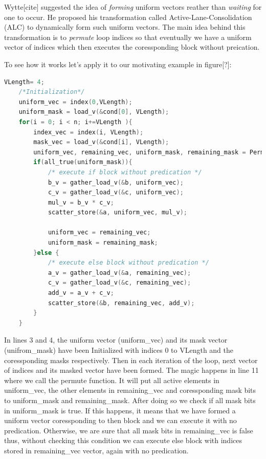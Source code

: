 \documentclass[\main/thesis.tex]{subfiles}
\begin{document}

Wytte[cite] suggested the idea of \emph{forming} uniform vectors reather than \emph{waiting} for one to occur. He proposed his transformation called Active-Lane-Consolidation (ALC) to dynamically form such uniform vectors. The main idea behind this transformation is to \emph{permute} loop indices
so that eventually we have a uniform vector of indices which then executes the coressponding block without preication. 

To see how it works let's apply it to our motivating example in figure[?]:
\begin{lstlisting}[language=C]
    VLength= 4;
    /*Initialization*/
    uniform_vec = index(0,VLength);
    uniform_mask = load_v(&cond[0], VLength);
    for(i = 0; i < n; i+=VLength ){
        index_vec = index(i, VLength);
        mask_vec = load_v(&cond[i], VLength);
        uniform_vec, remaining_vec, uniform_mask, remaining_mask = Permute(uniform_vec, index_vec, uniform_mask, mask_vec);        
        if(all_true(uniform_mask)){
            /* execute if block without predication */
            b_v = gather_load_v(&b, uniform_vec);
            c_v = gather_load_v(&c, uniform_vec);
            mul_v = b_v * c_v;
            scatter_store(&a, uniform_vec, mul_v);

            uniform_vec = remaining_vec;
            uniform_mask = remaining_mask;
        }else {     
            /* execute else block without predication */
            a_v = gather_load_v(&a, remaining_vec);
            c_v = gather_load_v(&c, remaining_vec);
            add_v = a_v + c_v;
            scatter_store(&b, remaining_vec, add_v);
        } 
    }
\end{lstlisting}

In lines 3 and 4, the uniform vector (uniform\_vec) and its mask vector (unifrom\_mask) have been Initialized with indices 0 to VLength and the coressponding masks respectively.
Then in each iteration of the loop, next vector of indices and its masked vector have been formed. The magic happens in line 11 where we call the permute function. It will put all active elements in uniform\_vec, the other elements in remaining\_vec and coressponding mask bits to uniform\_mask and remaining\_mask.
After doing so we check if all mask bits in uniform\_mask is true. If this happens, it means that we have formed a uniform vector coressponding to then block and we can execute it with no predication. Otherwise, we are sure that all mask bits in remaining\_vec is false thus, without checking this condition we can 
execute else block with indices stored in remaining\_vec vector, again with no predication.
\end{document}
